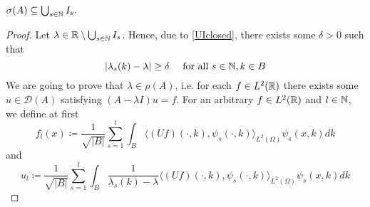  \begin{theorem} \label{4.1:thm-MainResult.SecondInclusion}

	$\sigma(A) \subseteq \bigcup_{s \in \mathbb{N}} I_{s}.$

	\begin{proof}
		Let $\lambda \in \mathbb{R} \setminus \bigcup_{s \in \mathbb{N}} I_{s}$. Hence, due to \eqref{UIclosed}, there exists some $\delta > 0$ such that
			\begin{equation}
				|\lambda_{s}(k) - \lambda| \geq \delta \quad \text{ for all } s \in \mathbb{N}, k \in B \label{lambda-distance}
			\end{equation}
		We are going to prove that $\lambda \in \rho(A)$, i.e. for each $f \in L^{2}(\mathbb{R})$ there exists some $u \in \mathcal{D}(A)$ satisfying $(A-\lambda I)u = f$. For an arbitrary $f \in L^{2}(\mathbb{R})$ and $l \in \mathbb{N}$, we define at first
			\[ f_{l}(x) \coloneqq \frac{1}{\sqrt{|B|}} \sum_{s=1}^{l} \int_{B} \langle (Uf)(\cdot, k), \psi_{s}(\cdot, k)\rangle_{L^{2}(\Omega)} \psi_{s}(x,k) dk \]
			and
			\begin{equation}
				u_{l} \coloneqq \frac{1}{\sqrt{|B|}} \sum_{s=1}^{l} \int_{B} \frac{1}{\lambda_{s}(k) - \lambda} \langle (Uf)(\cdot, k), \psi_{s}(\cdot, k)\rangle_{L^{2}(\Omega)} \psi_{s}(x, k) dk \label{ul}
			\end{equation} 


\end{proof}
\end{theorem}
